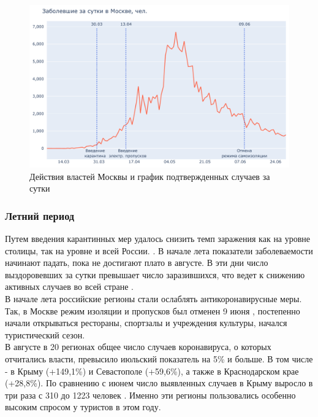 \documentclass[a4paper, 12pt]{extarticle}
\begin{document}
\begin{figure}[h]
    \centering
    \includegraphics[scale=0.55]{../plots/7daily_confirmed_with_events_moscow_1.pdf}
    \caption{Действия властей Москвы и график подтвержденных случаев за сутки}
    \label{fig:day_confirmed_moscow_with_events1}
\end{figure}

\subsubsection{Летний период}
Путем введения карантинных мер удалось снизить темп заражения как на уровне
столицы, так на уровне и всей России. . В начале лета показатели заболеваемости начинают падать, пока не достигают плато в августе. В эти дни число выздоровевших за сутки превышает число заразившихся, что ведет к снижению активных случаев во всей стране .
\\

В начале лета российские регионы стали ослаблять антикоронавирусные меры. Так, в Москве режим изоляции и пропусков был отменен 9 июня , постепенно начали открываться рестораны, спортзалы и учреждения культуры, начался туристический сезон.
\\

В августе в 20 регионах общее число случаев коронавируса, о которых отчитались власти, превысило июльский показатель на 5\% и больше. В том числе - в Крыму (+149,1\%) и Севастополе (+59,6\%), а также в Краснодарском крае (+28,8\%). По сравнению с июнем число выявленных случаев в Крыму выросло в три раза с 310 до 1223 человек . Именно эти регионы пользовались особенно высоким спросом у туристов в этом году.
\end{document}
